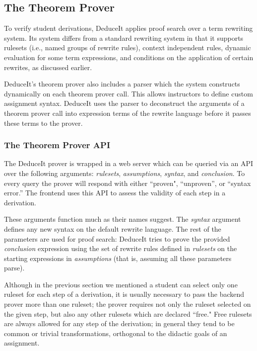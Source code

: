 \documentclass{sigchi}
\begin{document}
\subsection{The Theorem Prover}

To verify student derivations, DeduceIt applies proof search over a term rewriting system. Its system differs from a standard rewriting system in that it supports rulesets (i.e., named groups of rewrite rules), context independent rules, dynamic evaluation for some term expressions, and conditions on the application of certain rewrites, as discussed earlier.

DeduceIt's theorem prover also includes a parser which the system constructs dynamically on each theorem prover call. This allows instructors to define custom assignment syntax. DeduceIt uses the parser to deconstruct the arguments of a theorem prover call into expression terms of the rewrite language before it passes these terms to the prover.

\subsubsection{The Theorem Prover API}

The DeduceIt prover is wrapped in a web server which can be queried via an API over the following arguments: \textit{rulesets}, \textit{assumptions}, \textit{syntax}, and \textit{conclusion}. To every query the prover will respond with either ``proven", ``unproven'', or ``syntax error.'' The frontend uses this API to assess the validity of each step in a derivation.

These arguments function much as their names suggest. The \textit{syntax} argument defines any new syntax on the default rewrite language. The rest of the parameters are used for proof search: DeduceIt tries to prove the provided \textit{conclusion} expression using the set of rewrite rules defined in \textit{rulesets} on the starting expressions in \textit{assumptions} (that is, assuming all these parameters parse). 

Although in the previous section we mentioned a student can select only one ruleset for each step of a derivation, it is usually necessary to pass the backend prover more than one ruleset; the prover requires not only the ruleset selected on the given step, but also any other rulesets which are declared ``free." Free rulesets are always allowed for any step of the derivation; in general they tend to be common or trivial transformations, orthogonal to the didactic goals of an assignment. 
\end{document}
